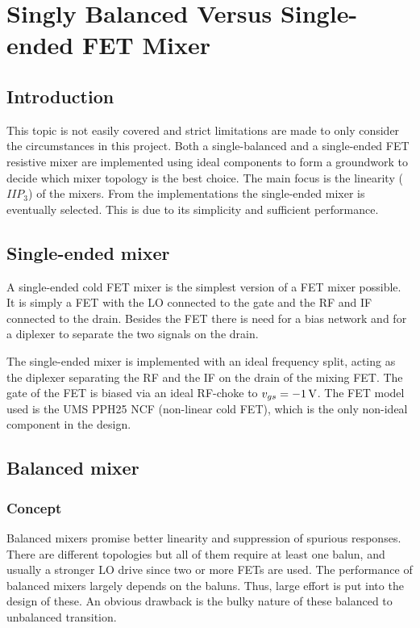 \chapter{Singly Balanced Versus Single-ended FET Mixer}\label{sec:endvsbal}
	\section{Introduction}
		This topic is not easily covered and strict limitations are made to only consider the circumstances in this project. Both a single-balanced and a single-ended FET resistive mixer are implemented using ideal components to form a groundwork to decide which mixer topology is the best choice. The main focus is the linearity ($IIP_3$) of the mixers. From the implementations the single-ended mixer is eventually selected. This is due to its simplicity and sufficient performance.
		
	\section{Single-ended mixer}
		A single-ended cold FET mixer is the simplest version of a FET mixer possible. It is simply a FET with the LO connected to the gate and the RF and IF connected to the drain. Besides the FET there is need for a bias network and for a diplexer to separate the two signals on the drain.
		
		The single-ended mixer is implemented with an ideal frequency split, acting as the diplexer separating the RF and the IF on the drain of the mixing FET. The gate of the FET is biased via an ideal RF-choke to $v_{gs}=\unit[-1]{V}$. The FET model used is the UMS PPH25 NCF (non-linear cold FET), which is the only non-ideal component in the design.
			
	\section{Balanced mixer}
		\subsection{Concept}
			Balanced mixers promise better linearity and suppression of spurious responses. There are different topologies but all of them require at least one balun, and usually a stronger LO drive since two or more FETs are used. The performance of balanced mixers largely depends on the baluns. Thus, large effort is put into the design of these. An obvious drawback is the bulky nature of these balanced to unbalanced transition.
			
